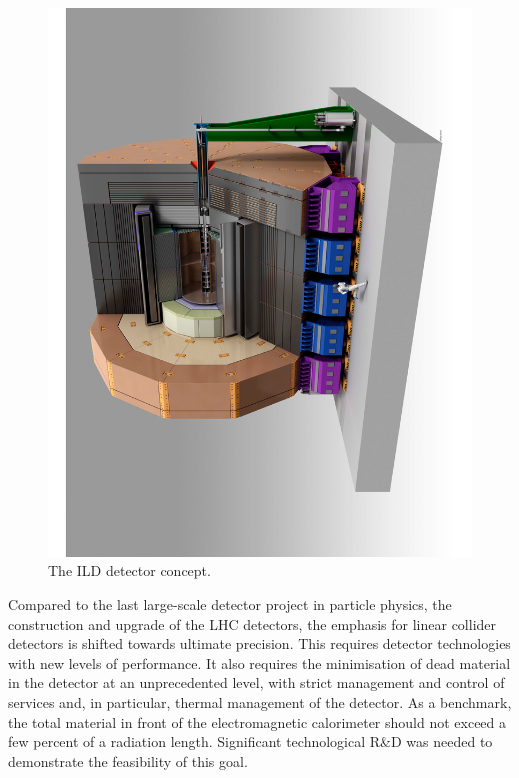 \documentclass[%
 reprint,
 amsmath,amssymb,
 aps,
]{revtex4-1}
\begin{document}
\begin{figure}[tb]
 \begin{center}
 \includegraphics[width=0.7\hsize,angle=-90]{figures/ILD.pdf}
\caption{The ILD detector concept.
\label{fig_ild}}
 \end{center}
 \vspace{-0.7cm}
 \end{figure}
 

Compared to the last large-scale detector project in particle physics,
the construction and upgrade of the LHC detectors, the 
emphasis for linear collider detectors
 is shifted towards ultimate precision. This requires detector technologies
with new levels of performance.  It also requires the  minimisation of
dead material in the detector at an unprecedented level, with strict
management and control of services and, in particular,
thermal management of the detector.  As a benchmark,  the total
material in front of the electromagnetic calorimeter should not exceed
a few percent of a radiation length. Significant technological R\&D was needed to
demonstrate the feasibility of this goal. 
\end{document}

